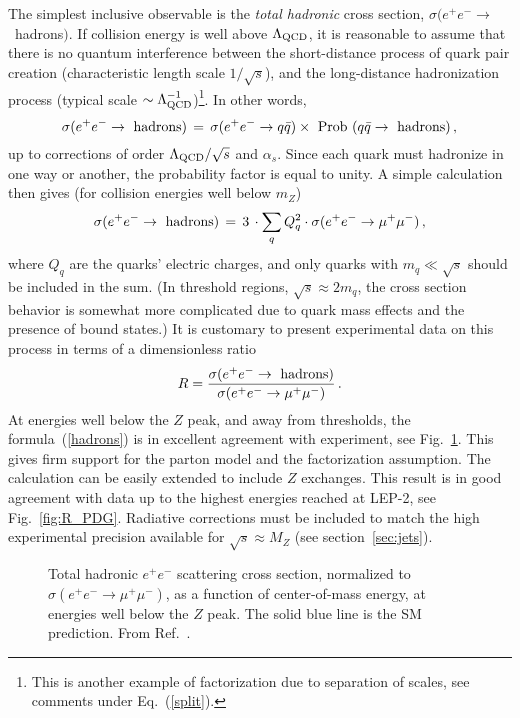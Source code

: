 \documentclass{ws-procs9x6}
\def\beq{\begin{equation}}
\def\eeq#1{\label{#1}\end{equation}}
\def\leqn#1{(\ref{#1})}
\begin{document}
The simplest inclusive observable is the {\it total hadronic} cross section, $\sigma(e^+e^-\to$~hadrons$)$. If collision energy is well above $\Lambda_{\rm QCD}$, it is reasonable to assume that there is no quantum interference between the short-distance process of quark pair creation (characteristic length scale $1/\sqrt{s}$), and the long-distance 
hadronization process (typical scale $\sim\Lambda^{-1}_{\rm QCD}$)\footnote{This is another example of factorization due to separation of scales, see comments under Eq.~\leqn{split}.}. In other words, 
\beq
\sigma(e^+e^-\to{\rm~hadrons}) \,=\,\sigma(e^+e^-\to q\bar{q})\times~{\rm Prob}~(q\bar{q}\to {\rm~hadrons}) \,,
\eeq{voila}
up to corrections of order $\Lambda_{\rm QCD}/\sqrt{s}$ and $\alpha_s$. 
Since each quark must hadronize in one way or another, the probability factor is equal to unity. A simple calculation then gives (for collision energies well below $m_Z$)
\beq
\sigma(e^+e^-\to{\rm~hadrons}) \,=\, 3\,\cdot \sum_q Q_q^2 \cdot \sigma(e^+e^-\to \mu^+\mu^-)\,, 
\eeq{hadrons}
where $Q_q$ are the quarks' electric charges, and only quarks with $m_q\ll \sqrt{s}$ should be included in the sum. (In threshold regions, $\sqrt{s}\approx 2m_q$, the cross section behavior is somewhat more complicated due to quark mass effects and the presence of bound states.) 
It is customary to present experimental data on this process in terms of a dimensionless ratio
\beq
R = \frac{\sigma(e^+e^-\to{\rm~hadrons})}{\sigma(e^+e^-\to \mu^+\mu^-)}\,.
\eeq{R}
At energies well below the $Z$ peak, and away from thresholds, the formula~\leqn{hadrons} is in excellent agreement with experiment, see Fig.~\ref{fig:R}. This gives firm support for the parton model and the factorization assumption. The calculation can be easily extended to include $Z$ exchanges. This result is in good agreement with data up to the highest energies reached at LEP-2, see Fig.~\ref{fig:R_PDG}. Radiative corrections must be included to match the high experimental precision available for $\sqrt{s}\approx M_Z$ (see section~\ref{sec:jets}).

\begin{figure}
\begin{center}
\end{center}
\caption{Total hadronic $e^+e^-$ scattering cross section, normalized to $\sigma(e^+e^-\to\mu^+\mu^-)$, as a function of center-of-mass energy, at energies well below the $Z$ peak. The solid blue line is the SM prediction. From Ref.~\cite{Rhadron}.}
\label{fig:R}
\end{figure}
\end{document}
